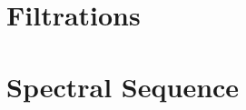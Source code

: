 \documentclass[../thesis.tex]{subfiles}
\begin{document}
    \section{Filtrations}

    \section{Spectral Sequence}
    
\end{document}
